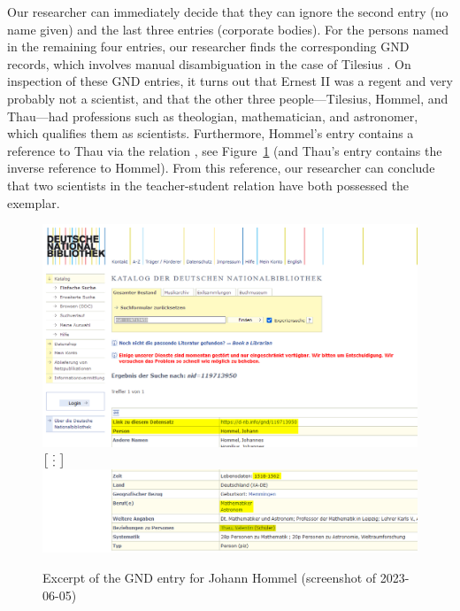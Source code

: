 Our researcher can immediately decide that they can ignore the second entry (no name given) and the last three entries (corporate bodies).
For the persons named in the remaining four entries, our researcher finds the corresponding \gls{GND} records,
which involves manual disambiguation in the case of \foreignlanguage{latin}{Tilesius}
\autocite{GNDTilesius,GNDHommel,GNDThau,GNDErnstII}.
On inspection of these \gls{GND} entries, it turns out that Ernest II was a regent and very probably not a scientist,
and that the other three people---\foreignlanguage{latin}{Tilesius}, \foreignlanguage{ngerman}{Hommel}, and \foreignlanguage{ngerman}{Thau}---had professions such as theologian,
mathematician, and astronomer, which qualifies them as scientists. Furthermore, \foreignlanguage{ngerman}{Hommel}'s entry
contains a reference to \foreignlanguage{ngerman}{Thau} via the relation , see Figure~\ref{fig:GND_Hommel}
(and \foreignlanguage{ngerman}{Thau}'s entry contains the inverse reference to \foreignlanguage{ngerman}{Hommel}).
From this reference, our researcher can conclude that two scientists in the teacher-student relation
have both possessed the exemplar. 

\begin{figure}[ht]
  \centering
  \includegraphics[width=.78\linewidth,trim=140 0 150 380,clip]{img/gnd_hommel_1.png} \\
  $\big[\raisebox{-1.8pt}{\rvdots}\big]$ \\
  \includegraphics[width=.78\linewidth,trim=140 0 150 0,clip]{img/gnd_hommel_2.png}
  \caption[%
    Excerpt of the GND entry for \foreignlanguage{ngerman}{Johann Hommel}%
  ]{%
    Excerpt of the GND entry for \foreignlanguage{ngerman}{Johann Hommel} (screenshot of 2023-06-05)%
  }
  \label{fig:GND_Hommel}
\end{figure}

